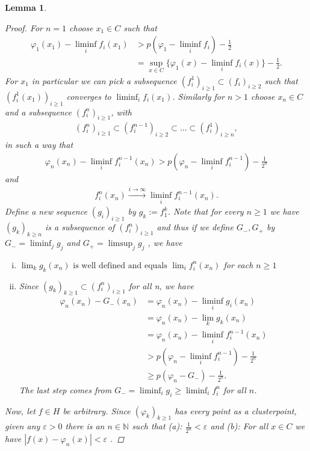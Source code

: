 \documentclass[10pt,twoside,openany,final]{memoir}
\theoremstyle{break}
\newtheorem{lemma}[section]{Lemma}
\theoremstyle{Break}
\newcommand{\N}{\mathbb{N}}
\begin{document}
\begin{lemma}
\begin{proof}
\noindent For $n=1$ choose $x_{1} \in C$ such that 
\begin{align*}
\varphi_{1}(x_{1})-\liminf_{i}f_{i}(x_{1}) &> p(\varphi_{1}-\liminf_{i}f_{i})-\frac{1}{2}\\
&=\sup_{x \in C} \{\varphi_{1}(x)-\liminf_{i}f_{i}(x) \}-\frac12.
\end{align*}
For $x_1$ in particular we can pick a subsequence $(f^1_i)_{i\geq1}\subset (f_i)_{i\geq2}$ such that $(f^1_i(x_1))_{i\geq 1}$ converges to $\liminf_{i}f_{i}(x_{1})$. Similarly for $n > 1$ choose $x_{n} \in C$ and a subsequence $(f_{i}^n)_{i  \geq 1}$, with
\begin{align*}
(f_{i}^n)_{i  \geq 1} \subset (f_{i}^{n-1})_{i  \geq 2} \subset \dots \subset (f_{i}^1)_{i \geq n},
\end{align*}
in such a way that 
\begin{align*}
\varphi_{n}(x_{n})-\liminf_{i}f_{i}^{n-1}(x_{n}) > p(\varphi_{n}-\liminf_{i}f_{i}^{n-1})-\frac{1}{2^n}
\end{align*}
and 
\begin{align*}
f_{i}^n(x_{n}) \stackrel{i \to \infty}{\to} \liminf_{i}f_{i}^{n-1}(x_{n}).
\end{align*}
Define a new sequence $(g_{i})_{i \geq 1}$ by $g_{k}:=f_{1}^k$. Note that for every $n\geq 1$ we have $(g_{k})_{k \geq n}$ is a subsequence of $(f_{i}^n)_{i \geq 1}$ and thus if we define $G_{-},G_{+}$ by $G_{-}=\liminf_{j}g_{j}$ and $G_{+}=\limsup_{j}g_{j}$ , we have 
\begin{enumerate}[(i)]
\item $\displaystyle \lim_{k} g_{k}(x_{n}) \text{ is well defined and equals } \lim_{i}f_{i}^n(x_{n})$ for each $n \geq 1$
\item Since $(g_{k})_{k\geq 1} \subset (f_{i}^n)_{i\geq 1}$ for all n,  we have \noindent \begin{align*}
\varphi_{n}(x_{n})-G_{-}(x_{n})&=\varphi_{n}(x_{n})-\liminf_{i}g_{i}(x_{n})\\
&= \varphi_{n}(x_{n})-\lim_{k} g_{k}(x_{n}) \\
&= \varphi_{n}(x_{n})-\liminf_{i}f_{i}^{n-1}(x_{n}) \\
&> p(\varphi_{n} - \liminf_{i} f_{i}^{n-1}) -\frac{1}{2^n} \\
&\geq p(\varphi_{n}-G_{-})-\frac{1}{2^n}.
\end{align*}
The last step comes from $G_{-}=\liminf_{i}g_{i}\geq \liminf_{i}f_{i}^n$ for all $n$. 
\end{enumerate}
Now, let $f \in H$ be arbitrary. Since $(\varphi_{k})_{k \geq 1}$ has every point as a clusterpoint, given any $\varepsilon>0$ there is an $n \in \N$ such that (a): $\displaystyle \frac{1}{2^n} < \varepsilon$ and (b): For all $x \in C$ we have $|f(x)-\varphi_{n}(x)| < \varepsilon$ .

\end{proof}
\end{lemma}
\end{document}
